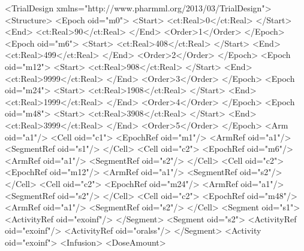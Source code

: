 \documentclass[a4paper,11pt]{article}
\begin{document}
\begin{xmlcode}
    <TrialDesign xmlns="http://www.pharmml.org/2013/03/TrialDesign">
        <Structure>
            <Epoch oid="m0">
                <Start>
                    <ct:Real>0</ct:Real>
                </Start>
                <End>
                    <ct:Real>90</ct:Real>
                </End>
                <Order>1</Order>
            </Epoch>
            <Epoch oid="m6">
                <Start>
                    <ct:Real>408</ct:Real>
                </Start>
                <End>
                    <ct:Real>499</ct:Real>
                </End>
                <Order>2</Order>
            </Epoch>
            <Epoch oid="m12">
                <Start>
                    <ct:Real>908</ct:Real>
                </Start>
                <End>
                    <ct:Real>9999</ct:Real>
                </End>
                <Order>3</Order>
            </Epoch>
            <Epoch oid="m24">
                <Start>
                    <ct:Real>1908</ct:Real>
                </Start>
                <End>
                    <ct:Real>1999</ct:Real>
                </End>
                <Order>4</Order>
            </Epoch>
            <Epoch oid="m48">
                <Start>
                    <ct:Real>3908</ct:Real>
                </Start>
                <End>
                    <ct:Real>3999</ct:Real>
                </End>
                <Order>5</Order>
            </Epoch>
            <Arm oid="a1"/>
            <Cell oid="c1">
                <EpochRef oid="m1"/>
                <ArmRef oid="a1"/>
                <SegmentRef oid="s1"/>
            </Cell>
            <Cell oid="c2">
                <EpochRef oid="m6"/>
                <ArmRef oid="a1"/>
                <SegmentRef oid="s2"/>
            </Cell>
            <Cell oid="c2">
                <EpochRef oid="m12"/>
                <ArmRef oid="a1"/>
                <SegmentRef oid="s2"/>
            </Cell>
            <Cell oid="c2">
                <EpochRef oid="m24"/>
                <ArmRef oid="a1"/>
                <SegmentRef oid="s2"/>
            </Cell>
            <Cell oid="c2">
                <EpochRef oid="m48"/>
                <ArmRef oid="a1"/>
                <SegmentRef oid="s2"/>
            </Cell>
            <Segment oid="s1">
                <ActivityRef oid="exoinf"/>
            </Segment>
            <Segment oid="s2">
                <ActivityRef oid="exoinf"/>
                <ActivityRef oid="oralss"/>
            </Segment>
            <Activity oid="exoinf">
                <Infusion>
                    <DoseAmount>

\end{xmlcode}
\end{document}
